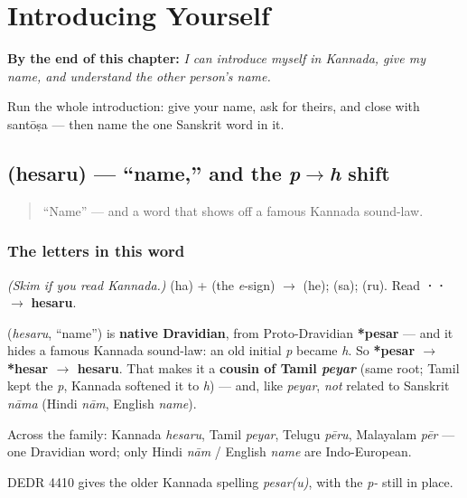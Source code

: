 
\chapter{Introducing Yourself}
\label{ch:introductions}

\begin{chapteropening}
\textbf{By the end of this chapter:} \emph{I can introduce myself in Kannada, give my name, and understand the other person's name.}

Run the whole introduction: give your name, ask for theirs, and close with santōṣa — then name the one Sanskrit word in it.
\end{chapteropening}

\section[\texorpdfstring{\kn{ಹೆಸರು} (hesaru)}{ಹೆಸರು (hesaru)}]{ (hesaru) — \textquotedblleft{}name,\textquotedblright{} and the \emph{p}$\to$\emph{h} shift}

\label{lesson:KA-C02-hesaru}



\begin{quote}
\textquotedblleft{}Name\textquotedblright{} — and a word that shows off a famous Kannada sound-law.
\end{quote}

\subsection*{The letters in this word}
\emph{(Skim if you read Kannada.)} \textbf{} (ha) + \textbf{} (the \emph{e}-sign) $\to$ \textbf{} (he); \textbf{} (sa); \textbf{} (ru). Read \textbf{··} $\to$ \textbf{hesaru}.

\begin{cousinweb}
\textbf{} (\emph{hesaru}, \textquotedblleft{}name\textquotedblright{}) is \textbf{native Dravidian}, from Proto-Dravidian \textbf{*pesar} — and it hides a famous Kannada sound-law: an old initial \emph{p} became \emph{h}. So \textbf{*pesar $\to$ *hesar $\to$ hesaru}. That makes it a \textbf{cousin of Tamil \emph{peyar}} (same root; Tamil kept the \emph{p}, Kannada softened it to \emph{h}) — and, like \emph{peyar}, \emph{not} related to Sanskrit \emph{nāma} (Hindi \emph{nām}, English \emph{name}).

Across the family: Kannada \emph{hesaru}, Tamil \emph{peyar}, Telugu \emph{pēru}, Malayalam \emph{pēr} — one Dravidian word; only Hindi \emph{nām} / English \emph{name} are Indo-European.

DEDR 4410 gives the older Kannada spelling \emph{pesar(u)}, with the \emph{p-} still in place.
\end{cousinweb}

